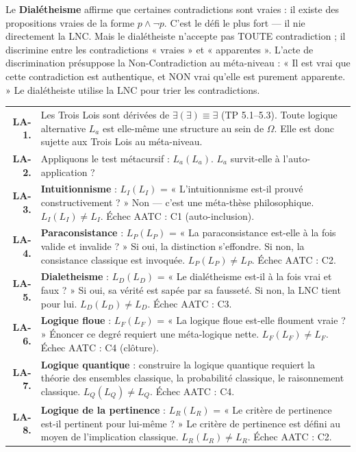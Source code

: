 \documentclass[10pt, openany, oneside]{book}
\renewcommand{\footnotesize}{\fontsize{8.5}{11}\selectfont}
\begin{document}
Le \textbf{Dialétheisme} affirme que certaines contradictions sont vraies : il existe des propositions vraies de la forme $p \wedge \neg p$. C'est le défi le plus fort --- il nie directement la LNC. Mais le dialétheiste n'accepte pas TOUTE contradiction ; il discrimine entre les contradictions « vraies » et « apparentes ». L'acte de discrimination présuppose la Non-Contradiction au méta-niveau : « Il est vrai que cette contradiction est authentique, et NON vrai qu'elle est purement apparente. » Le dialétheiste utilise la LNC pour trier les contradictions.


\vspace{0.5em}

{\footnotesize
\noindent\begin{tabular}{r p{}}
\textbf{LA-1.} & Les Trois Lois sont dérivées de $\exists(\exists) \equiv \exists$ (TP 5.1--5.3). Toute logique alternative $L_a$ est elle-même une structure au sein de $\Omega$. Elle est donc sujette aux Trois Lois au méta-niveau. \\[0.3em]
\textbf{LA-2.} & Appliquons le test métacursif : $L_a(L_a)$. $L_a$ survit-elle à l'auto-application ? \\[0.3em]
\textbf{LA-3.} & \textbf{Intuitionnisme} : $L_I(L_I)$ = « L'intuitionnisme est-il prouvé constructivement ? » Non --- c'est une méta-thèse philosophique. $L_I(L_I) \neq L_I$. Échec AATC : C1 (auto-inclusion). \\[0.3em]
\textbf{LA-4.} & \textbf{Paraconsistance} : $L_P(L_P)$ = « La paraconsistance est-elle à la fois valide et invalide ? » Si oui, la distinction s'effondre. Si non, la consistance classique est invoquée. $L_P(L_P) \neq L_P$. Échec AATC : C2. \\[0.3em]
\textbf{LA-5.} & \textbf{Dialetheisme} : $L_D(L_D)$ = « Le dialétheisme est-il à la fois vrai et faux ? » Si oui, sa vérité est sapée par sa fausseté. Si non, la LNC tient pour lui. $L_D(L_D) \neq L_D$. Échec AATC : C3. \\[0.3em]
\textbf{LA-6.} & \textbf{Logique floue} : $L_F(L_F)$ = « La logique floue est-elle floument vraie ? » Énoncer ce degré requiert une méta-logique nette. $L_F(L_F) \neq L_F$. Échec AATC : C4 (clôture). \\[0.3em]
\textbf{LA-7.} & \textbf{Logique quantique} : construire la logique quantique requiert la théorie des ensembles classique, la probabilité classique, le raisonnement classique. $L_Q(L_Q) \neq L_Q$. Échec AATC : C4. \\[0.3em]
\textbf{LA-8.} & \textbf{Logique de la pertinence} : $L_R(L_R)$ = « Le critère de pertinence est-il pertinent pour lui-même ? » Le critère de pertinence est défini au moyen de l'implication classique. $L_R(L_R) \neq L_R$. Échec AATC : C2. \\[0.3em]

\end{tabular}}
\end{document}

